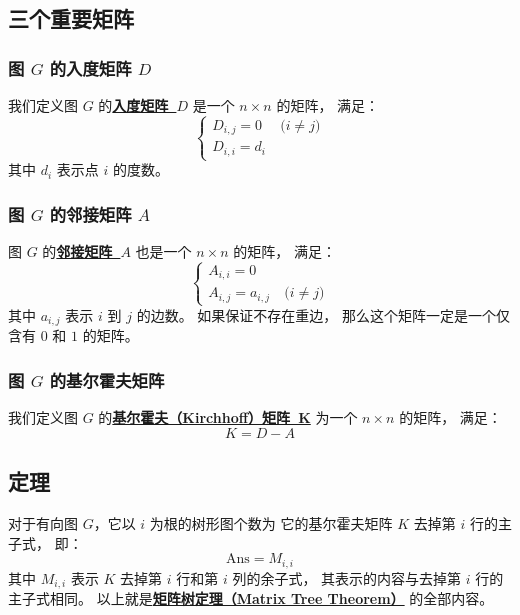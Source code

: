 \documentclass[UTF8]{article}
\begin{document}
	\subsection{三个重要矩阵}

	\subsubsection{图 $G$ 的入度矩阵 $D$}

	我们定义图 $G$ 的\textbf{\uline{入度矩阵~$D$}} 是一个 $n \times n$ 的矩阵，
	满足：
	\begin{equation*}
		\begin{cases}
			D_{i, j} = 0 & \pod {i \ne j}
			\\
			D_{i, i} = d_i
		\end{cases}
	\end{equation*}
	其中 $d_i$ 表示点 $i$ 的度数。

	\subsubsection{图 $G$ 的邻接矩阵 $A$}

	图 $G$ 的\textbf{\uline{邻接矩阵~$A$}} 也是一个 $n \times n$ 的矩阵，
	满足：
	\begin{equation*}
		\begin{cases}
			A_{i, i} = 0
			\\
			A_{i, j} = a_{i, j} & \pod {i \ne j}
		\end{cases}
	\end{equation*}
	其中 $a_{i, j}$ 表示 $i$ 到 $j$ 的边数。
	如果保证不存在重边，
	那么这个矩阵一定是一个仅含有 $0$ 和 $1$ 的矩阵。

	\subsubsection{图 $G$ 的基尔霍夫矩阵}

	我们定义图 $G$ 的\textbf{\uline{基尔霍夫（Kirchhoff）矩阵~K}}
	为一个 $n \times n$ 的矩阵，
	满足：
	$$
	K = D - A
	$$

	\subsection{定理}

	对于有向图 $G$，它以 $i$ 为根的树形图个数为
	它的基尔霍夫矩阵 $K$ 去掉第 $i$ 行的主子式，
	即：
	$$
	\mathrm{Ans} = M_{i, i}
	$$
	其中 $M_{i, i}$ 表示 $K$ 去掉第 $i$ 行和第 $i$ 列的余子式，
	其表示的内容与去掉第 $i$ 行的主子式相同。
	以上就是\textbf{\uline{矩阵树定理（Matrix Tree Theorem）}}
	的全部内容。
\end{document}
